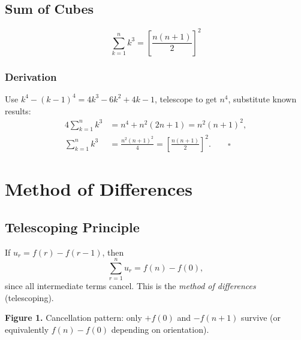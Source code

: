\documentclass[12pt,a4paper]{article}
\theoremstyle{defstyle}
\newcommand{\sumr}{\sum_{r=1}^{n}}
\newcommand{\sumk}{\sum_{k=1}^{n}}
\begin{document}
\subsection{Sum of Cubes}

\begin{result}{}{}
\[
  \sumk k^3 = \left[\frac{n(n+1)}{2}\right]^2
\]
\end{result}

\subsubsection*{Derivation}
Use \(k^4-(k-1)^4 = 4k^3-6k^2+4k-1\), telescope to get \(n^4\), substitute known results:
\[
\begin{aligned}
  4\sumk k^3 &= n^4 + n^2(2n+1) = n^2(n+1)^2, \\[4pt]
  \sumk k^3  &= \frac{n^2(n+1)^2}{4} = \left[\frac{n(n+1)}{2}\right]^2. \qquad\square
\end{aligned}
\]

\section{Method of Differences}

\subsection{Telescoping Principle}

If \(u_r = f(r)-f(r-1)\), then
\[
  \sumr u_r = f(n)-f(0),
\]
since all intermediate terms cancel. This is the \emph{method of differences} (telescoping).

\vspace{6pt}
\begin{center}
\end{center}
\noindent\textbf{Figure 1.} Cancellation pattern: only \(+f(0)\) and \(-f(n+1)\) survive (or equivalently \(f(n)-f(0)\) depending on orientation).
\end{document}
